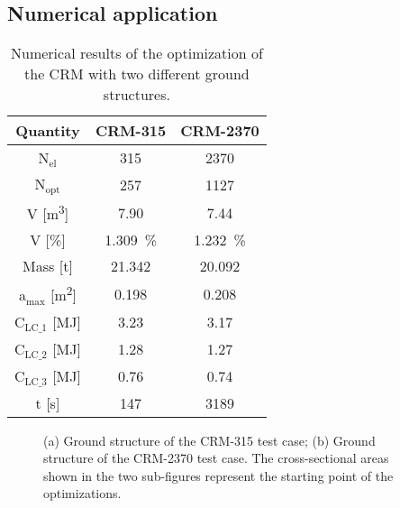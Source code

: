 \subsection{Numerical application}

\begin{table}
    \centering
    \begin{tabular}{ccc}
    \toprule
    \textbf{Quantity} & \textbf{CRM-315} & \textbf{CRM-2370} \\ \midrule
    N$_{\text{el}}$          & 315               & 2370               \\
    N$_{\text{opt}}$           & 257                  &  1127              \\
    V [\unit{\meter^3}]             &  7.90                 &  7.44             \\
    V [\unit{\%}]             &   \qty{1.309}{\%}                & \qty{1.232}{\%}               \\
    Mass [\unit{\tonne}]               &   21.342                & 20.092     \\
    a$_{\text{max}}$ [\unit{\meter^2}]           &  0.198                 & 0.208              \\
    C$_\text{LC\_1}$ [\unit{\mega \joule}]                &  3.23                 &  3.17              \\
    C$_\text{LC\_2}$ [\unit{\mega \joule}]                &   1.28                &  1.27              \\
    C$_\text{LC\_3}$ [\unit{\mega \joule}]                &   0.76                &  0.74              \\
    t [\unit{\second}]                & 147                  & 3189   \\ \bottomrule            
    \end{tabular}
    \caption{Numerical results of the optimization of the CRM with two different ground structures.}
    \label{tab:wing-res}
    \end{table}
    
    \begin{figure*}
        \centering
        \bigskip
        \caption{(a) Ground structure of the CRM-315 test case; (b) Ground structure of the CRM-2370 test case. The cross-sectional areas shown in the two sub-figures represent the starting point of the optimizations.}
        \label{fig:crm}
    \end{figure*}
    
